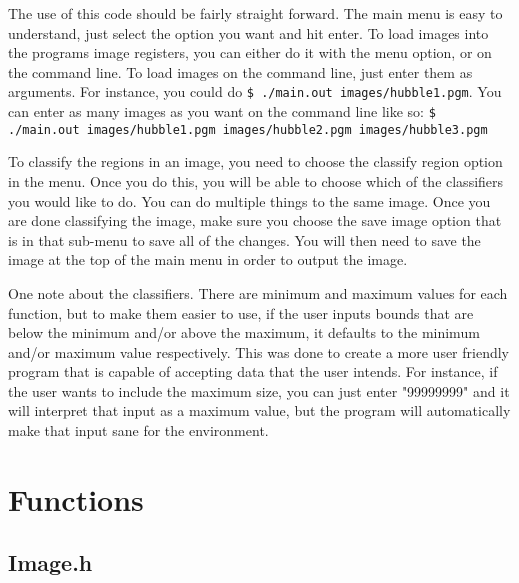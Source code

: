 \documentclass[pdftex, 11pt]{article}
\begin{document}
The use of this code should be fairly straight forward. The main menu is easy to understand, just select the option you
want and hit enter. To load images into the programs image registers, you can either do it with the menu option, or on
the command line. To load images on the command line, just enter them as arguments. For instance, you could do \texttt{\$
./main.out images/hubble1.pgm}. You can enter as many images as you want on the command line like so: \texttt{\$
./main.out images/hubble1.pgm images/hubble2.pgm images/hubble3.pgm}

To classify the regions in an image, you need to choose the classify region option in the menu. Once you do this, you
will be able to choose which of the classifiers you would like to do. You can do multiple things to the same image. Once
you are done classifying the image, make sure you choose the save image option that is in that sub-menu to save all of
the changes. You will then need to save the image at the top of the main menu in order to output the image. 

One note about the classifiers. There are minimum and maximum values for each function, but to make them easier to use,
if the user inputs bounds that are below the minimum and/or above the maximum, it defaults to the minimum and/or maximum
value respectively. This was done to create a more user friendly program that is capable of accepting data that the
user intends. For instance, if the user wants to include the maximum size, you can just enter "99999999" and it will
interpret that input as a maximum value, but the program will automatically make that input sane for the environment.

\section{Functions}

\subsection{Image.h}
\end{document}

